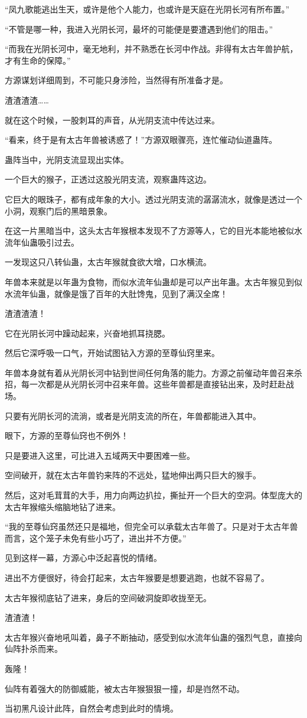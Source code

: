 \begin{this_body}
“凤九歌能逃出生天，或许是他个人能力，也或许是天庭在光阴长河有所布置。”

“不管是哪一种，我进入光阴长河，最坏的可能便是要遭遇到他们的阻击。”

“而我在光阴长河中，毫无地利，并不熟悉在长河中作战。非得有太古年兽护航，才有生命的保障。”

方源谋划详细周到，不可能只身涉险，当然得有所准备才是。

渣渣渣渣……

就在这个时候，一股刺耳的声音，从光阴支流中传达过来。

“看来，终于是有太古年兽被诱惑了！”方源双眼骤亮，连忙催动仙道蛊阵。

蛊阵当中，光阴支流显现出实体。

一个巨大的猴子，正透过这股光阴支流，观察蛊阵这边。

它巨大的眼珠子，都有成年象的大小。透过光阴支流的潺潺流水，就像是透过一个小洞，观察门后的黑暗景象。

在这一片黑暗当中，这头太古年猴根本发现不了方源等人，它的目光本能地被似水流年仙蛊吸引过去。

一发现这只八转仙蛊，太古年猴就食欲大增，口水横流。

年兽本来就是以年蛊为食物，而似水流年仙蛊却是可以产出年蛊。太古年猴见到似水流年仙蛊，就像是饿了百年的大肚馋鬼，见到了满汉全席！

渣渣渣渣！

它在光阴长河中躁动起来，兴奋地抓耳挠腮。

然后它深呼吸一口气，开始试图钻入方源的至尊仙窍里来。

年兽本身就有着从光阴长河中钻到世间任何角落的能力。方源之前催动年兽召来杀招，每一次都是从光阴长河中召来年兽。这些年兽都是直接钻出来，及时赶赴战场。

只要有光阴长河的流淌，或者是光阴支流的所在，年兽都能进入其中。

眼下，方源的至尊仙窍也不例外！

只是要进入这里，可比进入五域两天中要困难一些。

空间破开，就在太古年兽钓来阵的不远处，猛地伸出两只巨大的猴手。

然后，这对毛茸茸的大手，用力向两边扒拉，撕扯开一个巨大的空洞。体型庞大的太古年猴缩头缩脑地钻了进来。

“我的至尊仙窍虽然还只是福地，但完全可以承载太古年兽了。只是对于太古年兽而言，这个笼子未免有些小巧了，进出并不方便。”

见到这样一幕，方源心中泛起喜悦的情绪。

进出不方便很好，待会打起来，太古年猴要是想要逃跑，也就不容易了。

太古年猴彻底钻了进来，身后的空间破洞旋即收拢至无。

渣渣渣！

太古年猴兴奋地吼叫着，鼻子不断抽动，感受到似水流年仙蛊的强烈气息，直接向仙阵扑杀而来。

轰隆！

仙阵有着强大的防御威能，被太古年猴狠狠一撞，却是岿然不动。

当初黑凡设计此阵，自然会考虑到此时的情境。

\end{this_body}

